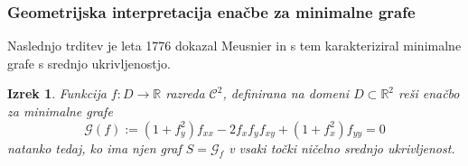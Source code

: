 \documentclass[8pt]{beamer}
\theoremstyle{definition}
\theoremstyle{remark}
\theoremstyle{plain}
\newtheorem{izrek}[definicija]{Izrek}
\numberwithin{equation}{section}  %
\begin{document}
\begin{frame}
    \frametitle{Geometrijska interpretacija enačbe za minimalne grafe}

    Naslednjo trditev je leta 1776 dokazal Meusnier in s tem karakteriziral minimalne grafe s srednjo ukrivljenostjo. 
    \begin{izrek}
        Funkcija $f: D \rightarrow \mathbb{R}$ razreda $\mathscr{C}^2$, definirana na domeni $D \subset \mathbb{R}^2$ reši enačbo za minimalne grafe 
        \begin{equation*}
            \mathscr{G}(f):=\left(1+f_y^2\right) f_{x x}-2 f_x f_y f_{x y}+\left(1+f_x^2\right) f_{y y}=0 
        \end{equation*}
        natanko tedaj, ko ima njen graf $S=\mathcal{G}_f$ v vsaki točki  ničelno srednjo ukrivljenost. 
    \end{izrek}
     
\end{frame}
\end{document}
